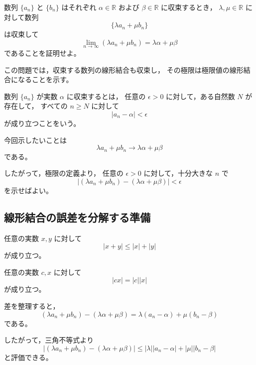 \begin{exercise}
	数列 $\{a_n\}$ と $\{b_n\}$ はそれぞれ
	$\alpha\in\mathbb{R}$ および $\beta\in\mathbb{R}$ に収束するとき，
	$\lambda,\mu\in\mathbb{R}$ に対して数列
	\[
		\{\lambda a_n+\mu b_n\}
	\]
	は収束して
	\[
		\lim_{n\to\infty}(\lambda a_n+\mu b_n)
		=
		\lambda\alpha+\mu\beta
	\]
	であることを証明せよ。
\end{exercise}
\begin{background}
	この問題では，収束する数列の線形結合も収束し，
	その極限は極限値の線形結合になることを示す。

	\begin{definition}[数列の収束]
		数列 $\{a_n\}$ が実数 $\alpha$ に収束するとは，
		任意の $\epsilon>0$ に対して，ある自然数 $N$ が存在して，
		すべての $n\geq N$ に対して
		\[
			|a_n-\alpha|<\epsilon
		\]
		が成り立つことをいう。
	\end{definition}

	\begin{remark}
		今回示したいことは
		\[
			\lambda a_n+\mu b_n
			\to
			\lambda\alpha+\mu\beta
		\]
		である。

		したがって，極限の定義より，
		任意の $\epsilon>0$ に対して，十分大きな $n$ で
		\[
			|(\lambda a_n+\mu b_n)-(\lambda\alpha+\mu\beta)|<\epsilon
		\]
		を示せばよい。
	\end{remark}

	\subsection{線形結合の誤差を分解する準備}

	\begin{lemma}[三角不等式]
		任意の実数 $x,y$ に対して
		\[
			|x+y|\leq |x|+|y|
		\]
		が成り立つ。
	\end{lemma}

	\begin{lemma}[定数倍と絶対値]
		任意の実数 $c,x$ に対して
		\[
			|cx|=|c||x|
		\]
		が成り立つ。
	\end{lemma}

	\begin{remark}
		差を整理すると，
		\[
			(\lambda a_n+\mu b_n)-(\lambda\alpha+\mu\beta)
			=
			\lambda(a_n-\alpha)+\mu(b_n-\beta)
		\]
		である。

		したがって，三角不等式より
		\[
			|(\lambda a_n+\mu b_n)-(\lambda\alpha+\mu\beta)|
			\leq
			|\lambda||a_n-\alpha|
			+
			|\mu||b_n-\beta|
		\]
		と評価できる。
	\end{remark}
\end{background}
